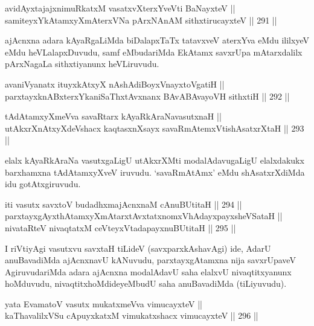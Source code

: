 
\begin{shl}
avidAyxtajajxnimuRkatxM vasatxvXterxYveVti BaNayxteV || \\
samiteyxYkAtamxyXmAterxVNa pArxNAnAM sithxtirucayxteV ||  291 ||  
\end{shl}	

\begin{artha}
ajAcnxna adara kAyaRgaLiMda biDalapxTaTx tatavxveV aterxYva eMdu
ililxyeV eMdu heVLalapxDuvudu, samf eMbudariMda EkAtamx savxrUpa
mAtarxdalilx pArxNagaLa sithxtiyanunx heVLiruvudu.
\end{artha}

\begin{shl}
avaniVyanatx ituyxkAtxyX nAshAdiBoyxV\s nayxtoVgatiH || \\
parxtayxknABxterxYkaniSaThxtAvxnanx BAvABAvayoVH sithxtiH ||  292 ||  
\end{shl}



\begin{shl}
tAdAtamxyXmeVva savaRtarx kAyaRkAraNavasutxnaH || \\
utAkxrXnAtxyXdeVshacx kaqtasxnXsayx savaRmAtemxVtishAsatxrXtaH ||  293 ||  
\end{shl}

\begin{artha}
elalx kAyaRkAraNa vasutxgaLigU utAkxrXMti modalAdavugaLigU elalxdakukx
barxhamxna tAdAtamxyXveV iruvudu. `savaRmAtAmx' eMdu shAsatxrXdiMda idu gotAtxgiruvudu.
\end{artha}

\begin{shl}
iti vasutx savxtoV budadhxmajAcnxnaM cAnuBUtitaH ||  294 ||  \\
parxtayxgAyxthAtamxyXmAtarxtAvxtatxnomxVhAdayxpayxsheVSataH || \\
nivataRteV nivaqtatxM ceVteyxVtadapayxnuBUtitaH ||  295 ||  
\end{shl}

\begin{artha}
I riVtiyAgi vasutxvu savxtaH tiLideV (savxparxkAshavAgi) ide, AdarU
anuBavadiMda ajAcnxnavU kANuvudu, parxtayxgAtamxna nija savxrUpaveV
AgiruvudariMda adara ajAcnxna modalAdavU saha elalxvU nivaqtitxyanunx
hoMduvudu, nivaqtitxhoMdideyeMbudU saha anuBavadiMda (tiLiyuvudu).
\end{artha}

\begin{shl}
yata EvamatoV vasutx mukatxmeVva vimucayxteV || \\
kaThavalilxVSu cApuyxkatxM vimukatxshacx vimucayxteV ||  296 ||  
\end{shl}

